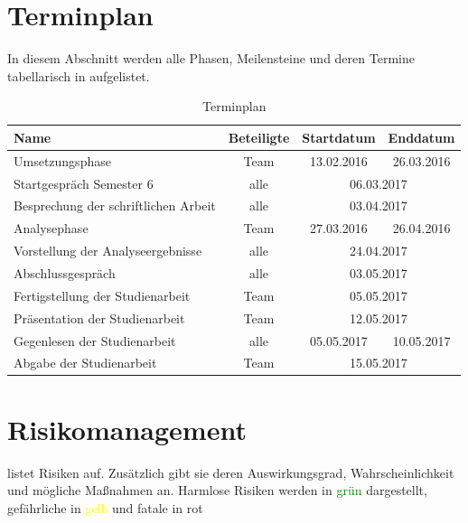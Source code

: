 \documentclass[
	pdftex,
	fontsize=12pt,          %
	DIV10,                  %
	ngerman,                %
	paper=a4,               %
	twoside=false,          %
	titlepage,              %
	parskip=half,           %
	headings=normal,        %
	listof=nochaptergap,  %
	bibliography=totoc, %
	index=totoc,            %
	captions=tableheading,  %
	final                 %
]{scrreprt}
\begin{document}
\section{Terminplan}

In diesem Abschnitt werden alle Phasen, Meilensteine und deren Termine tabellarisch in  aufgelistet.

\begin{table}[H]
\begin{tabular}[H]{|l|c|c|c|}
	\hline
	\rowcolor{lightgray}\textbf{Name} & \textbf{Beteiligte} & \textbf{Startdatum} & \textbf{Enddatum} \\\hline
	Umsetzungsphase & Team & 13.02.2016 & 26.03.2016 \\\hline
	Startgespräch Semester 6 & alle & \multicolumn{2}{c|}{06.03.2017} \\\hline
	Besprechung der schriftlichen Arbeit & alle & \multicolumn{2}{c|}{03.04.2017} \\\hline
	Analysephase & Team & 27.03.2016 & 26.04.2016 \\\hline
	Vorstellung der Analyseergebnisse & alle & \multicolumn{2}{c|}{24.04.2017} \\\hline
	Abschlussgespräch & alle & \multicolumn{2}{c|}{03.05.2017} \\\hline
	Fertigstellung der Studienarbeit & Team & \multicolumn{2}{c|}{05.05.2017} \\\hline
	Präsentation der Studienarbeit & Team & \multicolumn{2}{c|}{12.05.2017} \\\hline
	Gegenlesen der Studienarbeit & alle & 05.05.2017 & 10.05.2017 \\\hline
	Abgabe der Studienarbeit & Team & \multicolumn{2}{c|}{15.05.2017} \\\hline
\end{tabular}
	\caption{Terminplan}
	\label{tab:terminplan}
\end{table}

\section{Risikomanagement}

 listet Risiken auf. Zusätzlich gibt sie deren Auswirkungsgrad, Wahrscheinlichkeit und mögliche Maßnahmen an. Harmlose Risiken werden in \textcolor{green}{grün} dargestellt, gefährliche in \textcolor{yellow}{gelb} und fatale in \textcolor{RedOrange}{rot}
\end{document}
